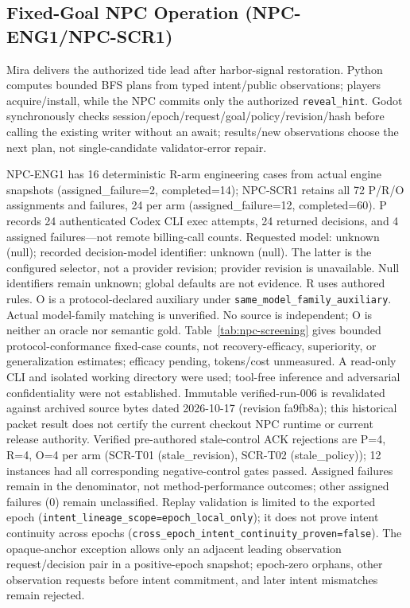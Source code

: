 \subsection{Fixed-Goal NPC Operation (NPC-ENG1/NPC-SCR1)}
Mira delivers the authorized tide lead after harbor-signal restoration. Python computes bounded BFS plans from typed intent/public observations; players acquire/install, while the NPC commits only the authorized \texttt{reveal\_hint}. Godot synchronously checks session/epoch/request/goal/policy/revision/hash before calling the existing writer without an await; results/new observations choose the next plan, not single-candidate validator-error repair.

NPC-ENG1 has 16 deterministic R-arm engineering cases from actual engine snapshots (assigned\_failure=2, completed=14); NPC-SCR1 retains all 72 P/R/O assignments and failures, 24 per arm (assigned\_failure=12, completed=60). P records 24 authenticated Codex CLI exec attempts, 24 returned decisions, and 4 assigned failures—not remote billing-call counts. Requested model: unknown (null); recorded decision-model identifier: unknown (null). The latter is the configured selector, not a provider revision; provider revision is unavailable. Null identifiers remain unknown; global defaults are not evidence. R uses authored rules. O is a protocol-declared auxiliary under \texttt{same\_model\_family\_auxiliary}. Actual model-family matching is unverified. No source is independent; O is neither an oracle nor semantic gold. Table~\ref{tab:npc-screening} gives bounded protocol-conformance fixed-case counts, not recovery-efficacy, superiority, or generalization estimates; efficacy pending, tokens/cost unmeasured. A read-only CLI and isolated working directory were used; tool-free inference and adversarial confidentiality were not established.
Immutable verified-run-006 is revalidated against archived source bytes dated 2026-10-17 (revision fa9fb8a); this historical packet result does not certify the current checkout NPC runtime or current release authority.
Verified pre-authored stale-control ACK rejections are P=4, R=4, O=4 per arm (SCR-T01 (stale\_revision), SCR-T02 (stale\_policy)); 12 instances had all corresponding negative-control gates passed. Assigned failures remain in the denominator, not method-performance outcomes; other assigned failures (0) remain unclassified.
Replay validation is limited to the exported epoch (\texttt{intent\_lineage\_scope=epoch\_local\_only}); it does not prove intent continuity across epochs (\texttt{\small cross\_epoch\_intent\_continuity\_proven=false}). The opaque-anchor exception allows only an adjacent leading observation request/decision pair in a positive-epoch snapshot; epoch-zero orphans, other observation requests before intent commitment, and later intent mismatches remain rejected.
